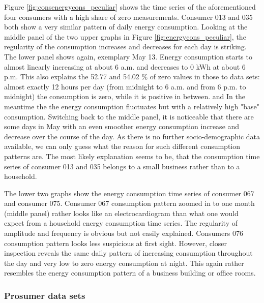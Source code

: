 Figure \ref{fig:consenergycons_peculiar} shows the time series of the aforementioned four consumers with a high share of zero measurements. Consumer 013 and 035 both show a very similar pattern of daily energy consumption. Looking at the middle panel of the two upper graphs in Figure \ref{fig:energycons_peculiar}, the regularity of the consumption increases and decreases for each day is striking. The lower panel shows again, exemplary May 13. Energy consumption starts to almost linearly increasing at about 6 a.m. and decreases to 0 kWh at about 6 p.m. This also explains the 52.77 and 54.02 \% of zero values in those to data sets: almost exactly 12 hours per day (from midnight to 6 a.m. and from 6 p.m. to midnight) the consumption is zero, while it is positive in between. and  In the meantime the the energy consumption fluctuates but with a relatively high "base" consumption. Switching back to the middle panel, it is noticeable that there are some days in May with an even smoother energy consumption increase and decrease over the course of the day. As there is no further socio-demographic data available, we can only guess what the reason for such different consumption patterns are. The most likely explanation seems to be, that the consumption time series of consumer 013 and 035 belongs to a small business rather than to a household.

The lower two graphs show the energy consumption time series of consumer 067 and consumer 075. Consumer 067 consumption pattern zoomed in to one month (middle panel) rather looks like an electrocardiogram than what one would expect from a household energy consumption time series. The regularity of amplitude and frequency is obvious but not easily explained. Consumers 076 consumption pattern looks less suspicious at first sight. However, closer inspection reveals the same daily pattern of increasing consumption throughout the day and very low to zero energy consumption at night. This again rather resembles the energy consumption pattern of a business building or office rooms.



\subsubsection{Prosumer data sets}

